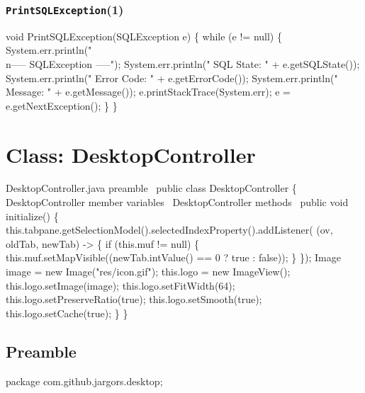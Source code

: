 \subsection{\texttt{PrintSQLException}(1)}
\nwenddocs{}\endmoddef{}
void PrintSQLException(SQLException e) \{
  while (e != null) \{
    System.err.println("\\n----- SQLException -----");
    System.err.println("  SQL State:  " + e.getSQLState());
    System.err.println("  Error Code: " + e.getErrorCode());
    System.err.println("  Message:    " + e.getMessage());
    e.printStackTrace(System.err);
    e = e.getNextException();
  \}
\}
\eatline
{}\nwendcode{}\nwdocspar
\nwenddocs{}\chapter{Class: DesktopController}
\label{deskcon}

\nwenddocs{}\endmoddef{}
\LA{}DesktopController.java preamble~{\nwtagstyle{}}\RA{}
public class DesktopController \{
  \LA{}\code{}DesktopController\edoc{} member variables~{\nwtagstyle{}}\RA{}
  \LA{}\code{}DesktopController\edoc{} methods~{\nwtagstyle{}}\RA{}
  public void initialize() \{
    this.tabpane.getSelectionModel().selectedIndexProperty().addListener(
        (ov, oldTab, newTab) -> \{
      if (this.muf != null) \{
        this.muf.setMapVisible((newTab.intValue() == 0 ? true : false));
      \}
    \});
    Image image = new Image("res/icon.gif");
    this.logo = new ImageView();
    this.logo.setImage(image);
    this.logo.setFitWidth(64);
    this.logo.setPreserveRatio(true);
    this.logo.setSmooth(true);
    this.logo.setCache(true);
  \}
\}
\nwendcode{}\nwdocspar

\section{Preamble}
\nwenddocs{}\endmoddef{}
package com.github.jargors.desktop;
\nwendcode{}\nwdocspar

